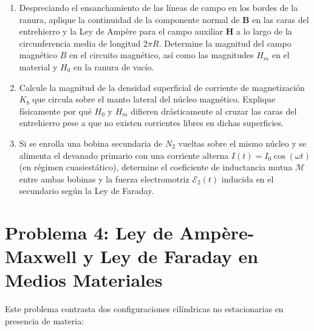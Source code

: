 \documentclass[11pt]{article}
\begin{document}
\begin{enumerate}
    \item[a)] Despreciando el ensanchamiento de las líneas de campo en los bordes de la ranura, aplique la continuidad de la componente normal de $\mathbf{B}$ en las caras del entrehierro y la Ley de Ampère para el campo auxiliar $\mathbf{H}$ a lo largo de la circunferencia media de longitud $2\pi R$. Determine la magnitud del campo magnético $B$ en el circuito magnético, así como las magnitudes $H_m$ en el material y $H_0$ en la ranura de vacío.
    \item[b)] Calcule la magnitud de la densidad superficial de corriente de magnetización $K_b$ que circula sobre el manto lateral del núcleo magnético. Explique físicamente por qué $H_0$ y $H_m$ difieren drásticamente al cruzar las caras del entrehierro pese a que no existen corrientes libres en dichas superficies.
    \item[c)] Si se enrolla una bobina secundaria de $N_2$ vueltas sobre el mismo núcleo y se alimenta el devanado primario con una corriente alterna $I(t) = I_0 \cos(\omega t)$ (en régimen cuasiestático), determine el coeficiente de inductancia mutua $\mathcal{M}$ entre ambas bobinas y la fuerza electromotriz $\mathcal{E}_2(t)$ inducida en el secundario según la Ley de Faraday.
\end{enumerate}

\vspace{0.3cm}

\section*{Problema 4: Ley de Ampère-Maxwell y Ley de Faraday en Medios Materiales}

Este problema contrasta dos configuraciones cilíndricas no estacionarias en presencia de materia:
\end{document}
